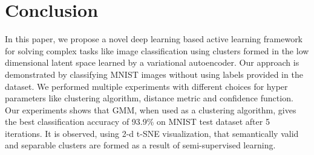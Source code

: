 \documentclass[runningheads]{llncs}
\begin{document}
\section{Conclusion}
In this paper, we propose a novel deep learning based active learning framework for solving complex tasks like image classification using clusters formed in the low dimensional latent space learned by a variational autoencoder.
Our approach is demonstrated by classifying MNIST images without using labels provided in the dataset.
We performed multiple experiments with different choices for hyper parameters like clustering algorithm, distance metric and confidence function.
Our experiments shows that GMM, when used as a clustering algorithm,  gives the best classification accuracy of 93.9\% on MNIST test dataset after 5 iterations.
It is observed, using 2-d t-SNE visualization, that  semantically valid and separable clusters are formed as a result of semi-supervised learning.
%
%
%

%
%
\end{document}
